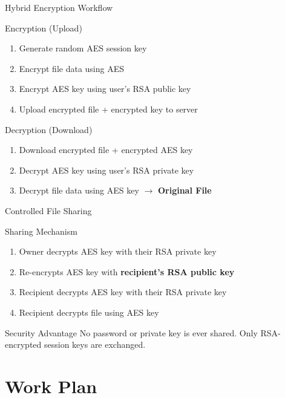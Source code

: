 \documentclass{SKP-beamer}
\begin{document}
\begin{frame}{Hybrid Encryption Workflow}
\begin{block}{Encryption (Upload)}
\begin{enumerate}
  \item Generate random AES session key
  \item Encrypt file data using AES
  \item Encrypt AES key using user's RSA public key
  \item Upload encrypted file + encrypted key to server
\end{enumerate}
\end{block}

\begin{block}{Decryption (Download)}
\begin{enumerate}
  \item Download encrypted file + encrypted AES key
  \item Decrypt AES key using user's RSA private key
  \item Decrypt file data using AES key $\rightarrow$ \textbf{Original File}
\end{enumerate}
\end{block}
\end{frame}

\begin{frame}{Controlled File Sharing}
\begin{block}{Sharing Mechanism}
\begin{enumerate}
  \item Owner decrypts AES key with their RSA private key
  \item Re-encrypts AES key with \textbf{recipient's RSA public key}
  \item Recipient decrypts AES key with their RSA private key
  \item Recipient decrypts file using AES key
\end{enumerate}
\end{block}
\vspace{0.3cm}
\begin{alertblock}{Security Advantage}
No password or private key is ever shared. Only RSA-encrypted session keys are exchanged.
\end{alertblock}
\end{frame}

\section{Work Plan}
\end{document}
